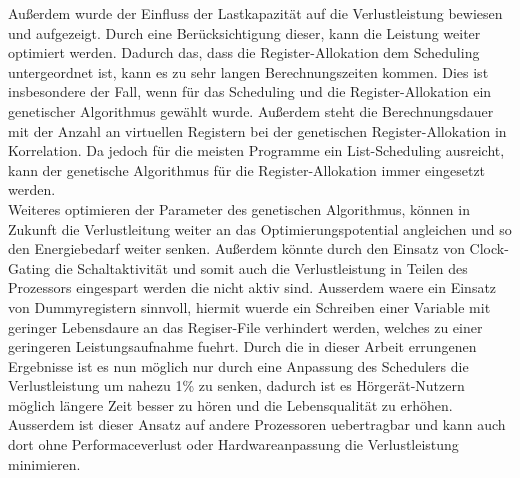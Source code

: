 Außerdem wurde der Einfluss der Lastkapazität auf die Verlustleistung bewiesen und aufgezeigt. Durch eine Berücksichtigung dieser, kann die Leistung weiter optimiert werden.
Dadurch das, dass die Register-Allokation dem Scheduling untergeordnet ist, kann es zu sehr langen Berechnungszeiten kommen. Dies ist insbesondere der Fall, wenn für das Scheduling und die Register-Allokation ein genetischer Algorithmus gewählt wurde. Außerdem steht die Berechnungsdauer mit der Anzahl an virtuellen Registern bei der genetischen Register-Allokation in Korrelation. Da jedoch für die meisten Programme ein List-Scheduling ausreicht, kann der genetische Algorithmus für die Register-Allokation immer eingesetzt werden.\\
Weiteres optimieren der Parameter des genetischen Algorithmus, können in Zukunft die Verlustleitung weiter an das Optimierungspotential angleichen und so den Energiebedarf weiter senken. Außerdem könnte durch den Einsatz von Clock-Gating die Schaltaktivität und somit auch die Verlustleistung in Teilen des Prozessors eingespart werden die nicht aktiv sind. Ausserdem waere ein Einsatz von Dummyregistern sinnvoll, hiermit wuerde ein Schreiben einer Variable mit geringer Lebensdaure an das Regiser-File verhindert werden, welches zu einer geringeren Leistungsaufnahme fuehrt.
Durch die in dieser Arbeit errungenen Ergebnisse ist es nun möglich nur durch eine Anpassung des Schedulers die Verlustleistung um nahezu 1\% zu senken, dadurch ist es Hörgerät-Nutzern möglich längere Zeit besser zu hören und die Lebensqualität zu erhöhen. Ausserdem ist dieser Ansatz auf andere Prozessoren uebertragbar und kann auch dort ohne Performaceverlust oder Hardwareanpassung die Verlustleistung minimieren.\\

%


